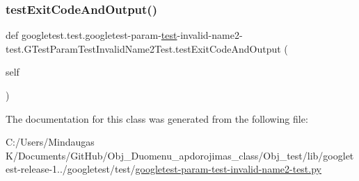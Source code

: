 \subsubsection{\texorpdfstring{testExitCodeAndOutput()}{testExitCodeAndOutput()}}
{\footnotesize\ttfamily def googletest.\+test.\+googletest-\/param-\/\mbox{\hyperlink{_mutual_8h_a707ee03719e99670bf6cfdfd897b8456}{test}}-\/invalid-\/name2-\/test.\+G\+Test\+Param\+Test\+Invalid\+Name2\+Test.\+test\+Exit\+Code\+And\+Output (\begin{DoxyParamCaption}\item[{}]{self }\end{DoxyParamCaption})}



The documentation for this class was generated from the following file\+:\begin{DoxyCompactItemize}
\item 
C\+:/\+Users/\+Mindaugas K/\+Documents/\+Git\+Hub/\+Obj\+\_\+\+Duomenu\+\_\+apdorojimas\+\_\+class/\+Obj\+\_\+test/lib/googletest-\/release-\/1../googletest/test/\mbox{\hyperlink{_obj__test_2lib_2googletest-release-1_88_81_2googletest_2test_2googletest-param-test-invalid-name2-test_8py}{googletest-\/param-\/test-\/invalid-\/name2-\/test.\+py}}\end{DoxyCompactItemize}

